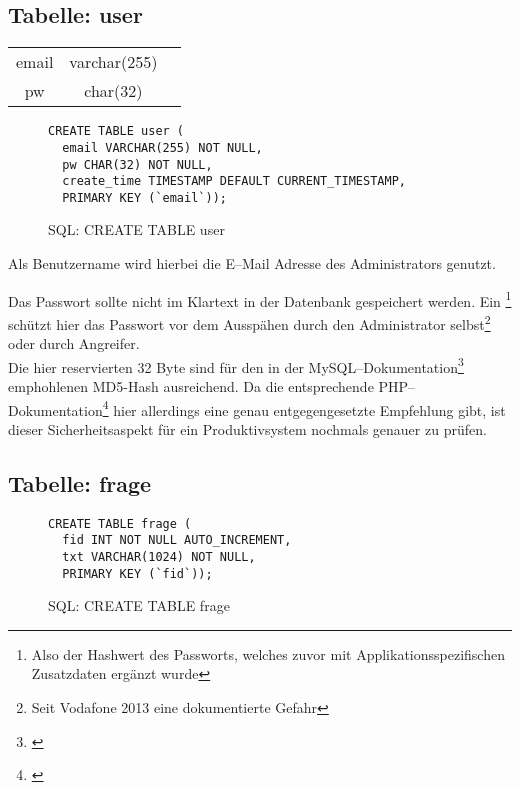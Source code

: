\subsection{Tabelle: user}
\begin{center}
\begin{supertabular}{c|c|c}
\hline
email & varchar(255) &  \\
pw & char(32) &  \\
\end{supertabular}
\end{center}


\begin{figure}[h]
\begin{verbatim}
CREATE TABLE user (
  email VARCHAR(255) NOT NULL,
  pw CHAR(32) NOT NULL,
  create_time TIMESTAMP DEFAULT CURRENT_TIMESTAMP,
  PRIMARY KEY (`email`));
\end{verbatim}
\caption{SQL: CREATE TABLE user}
\label{sql:tbluser}
\end{figure}

Als Benutzername wird hierbei die E--Mail Adresse des Administrators genutzt. 

Das Passwort sollte nicht im Klartext in der Datenbank gespeichert werden. Ein \footnote{Also der Hashwert des Passworts, welches zuvor mit Applikationsspezifischen Zusatzdaten ergänzt wurde} schützt hier das Passwort vor dem Ausspähen durch den Administrator selbst\footnote{Seit Vodafone 2013 eine dokumentierte Gefahr} oder durch Angreifer.\\
Die hier reservierten 32 Byte sind für den in der MySQL--Dokumentation\footnote{\cite{mysql-pcrypt}} emphohlenen MD5-Hash ausreichend. Da die entsprechende PHP--Dokumentation\footnote{\cite{php-pcrypt}} hier allerdings eine genau entgegengesetzte Empfehlung gibt, ist dieser Sicherheitsaspekt für ein Produktivsystem nochmals genauer zu prüfen.

\subsection{Tabelle: frage}
\begin{figure}[h]
\begin{verbatim}
CREATE TABLE frage (
  fid INT NOT NULL AUTO_INCREMENT,
  txt VARCHAR(1024) NOT NULL,
  PRIMARY KEY (`fid`));
\end{verbatim}
\caption{SQL: CREATE TABLE frage}
\label{sql:tblfrage}
\end{figure}

